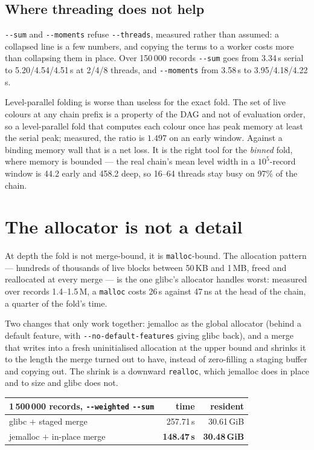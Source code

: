 \documentclass[11pt,a4paper]{article}
\newcommand{\flag}[1]{\texttt{-{}-#1}}
\begin{document}
\subsection{Where threading does not help}

\flag{sum} and \flag{moments} refuse \flag{threads}, measured rather than
assumed: a collapsed line is a few numbers, and copying the terms to a worker
costs more than collapsing them in place. Over 150\,000 records \flag{sum} goes
from 3.34\,s serial to 5.20/4.54/4.51\,s at 2/4/8 threads, and \flag{moments}
from 3.58\,s to 3.95/4.18/4.22\,s.

Level-parallel folding is worse than useless for the exact fold. The set of live
colours at any chain prefix is a property of the DAG and not of evaluation
order, so a level-parallel fold that computes each colour once has peak memory
at least the serial peak; measured, the ratio is $1.497$ on an early window.
Against a binding memory wall that is a net loss. It is the right tool for the
\emph{binned} fold, where memory is bounded --- the real chain's mean level width
in a $10^5$-record window is 44.2 early and 458.2 deep, so 16--64 threads stay
busy on 97\% of the chain.

\section{The allocator is not a detail}
\label{sec:allocator}

At depth the fold is not merge-bound, it is \texttt{malloc}-bound. The
allocation pattern --- hundreds of thousands of live blocks between 50\,KB and
1\,MB, freed and reallocated at every merge --- is the one glibc's allocator
handles worst: measured over records 1.4--1.5\,M, a \texttt{malloc} costs
26\,\textmu s against 47\,ns at the head of the chain, a quarter of the fold's
time.

Two changes that only work together: jemalloc as the global allocator (behind a
default feature, with \texttt{-{}-no-default-features} giving glibc back), and a
merge that writes into a fresh uninitialised allocation at the upper bound and
shrinks it to the length the merge turned out to have, instead of zero-filling a
staging buffer and copying out. The shrink is a downward \texttt{realloc}, which
jemalloc does in place and to size and glibc does not.

\begin{center}
\begin{tabular}{lrr}
\toprule
1\,500\,000 records, \flag{weighted} \flag{sum} & time & resident \\
\midrule
glibc $+$ staged merge      & 257.71\,s & 30.61\,GiB \\
jemalloc $+$ in-place merge & \textbf{148.47\,s} & \textbf{30.48\,GiB} \\
\bottomrule
\end{tabular}
\end{center}
\end{document}
